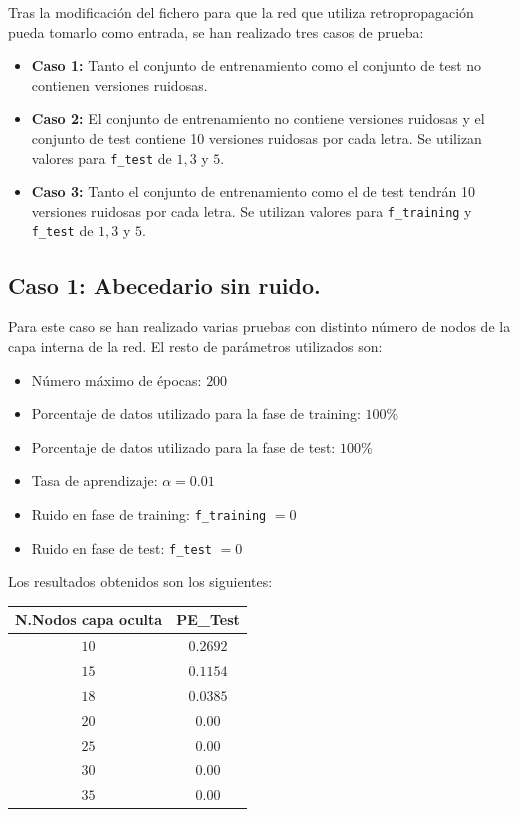 \documentclass[spanish]{assignment}
\begin{document}
	Tras la modificación del fichero para que la red que utiliza retropropagación pueda tomarlo como entrada, se han realizado tres casos de prueba:
	\begin{itemize}
		\item \textbf{Caso 1:} Tanto el conjunto de entrenamiento como el conjunto de test no contienen versiones ruidosas.
		\item \textbf{Caso 2:} El conjunto de entrenamiento no contiene versiones ruidosas y el conjunto de test contiene 10 versiones ruidosas por cada letra. Se utilizan valores para \texttt{f\_test} de $1, 3$ y $5$.
		\item \textbf{Caso 3:} Tanto el conjunto de entrenamiento como el de test tendrán 10 versiones ruidosas por cada letra. Se utilizan valores para \texttt{f\_training} y \texttt{f\_test} de $1, 3$ y $5$.
	\end{itemize}
	
	\subsection{Caso 1: Abecedario sin ruido.}
	Para este caso se han realizado varias pruebas con distinto número de nodos de la capa interna de la red. El resto de parámetros utilizados son:
	\begin{itemize}
		\item Número máximo de épocas: $200$
		\item Porcentaje de datos utilizado para la fase de training: $100\%$
		\item Porcentaje de datos utilizado para la fase de test: $100\%$
		\item Tasa de aprendizaje: $\alpha = 0.01$
		\item Ruido en fase de training: \texttt{f\_training} $= 0$
		\item Ruido en fase de test: \texttt{f\_test} $= 0$
	\end{itemize}
	
	Los resultados obtenidos son los siguientes:
	\begin{center}
	\begin{tabular}{|c|c|}
		\hline
		\textbf{N.Nodos capa oculta} & \textbf{PE\_Test} \\ 
		\hline
		$10$ & $0.2692$ \\
		$15$ & $0.1154$ \\
		$18$ & $0.0385$ \\
		$20$ & $0.00$ \\
		$25$ & $0.00$ \\
		$30$ & $0.00$ \\
		$35$ & $0.00$\\
		\hline
	\end{tabular}
	\end{center}
	
\end{document}
